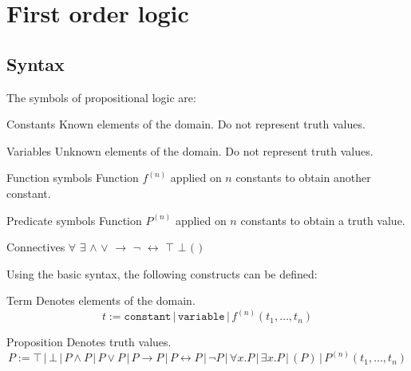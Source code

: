 \chapter{First order logic}


\section{Syntax}
The symbols of propositional logic are:
\begin{descriptionlist}
    \item[Constants]
        Known elements of the domain. Do not represent truth values.
        
    \item[Variables]
        Unknown elements of the domain. Do not represent truth values.
    
    \item[Function symbols] 
        Function $f^{(n)}$ applied on $n$ constants to obtain another constant.

    \item[Predicate symbols]
        Function $P^{(n)}$ applied on $n$ constants to obtain a truth value.

    \item[Connectives] $\forall$ $\exists$ $\land$ $\vee$ $\rightarrow$ $\lnot$ $\leftrightarrow$ $\top$ $\bot$ $($ $)$
\end{descriptionlist}

Using the basic syntax, the following constructs can be defined:
\begin{descriptionlist}
    \item[Term] Denotes elements of the domain.
        \[ t := \texttt{constant} \,|\, \texttt{variable} \,|\, f^{(n)}(t_1, \dots, t_n) \]

    \item[Proposition] Denotes truth values.
        \[
            P := \top \,|\, \bot \,|\, P \land P \,|\, P \vee P \,|\,  P \rightarrow P \,|\, P \leftrightarrow P \,|\, 
                \lnot P \,|\, \forall x. P \,|\, \exists x. P \,|\, (P) \,|\, P^{(n)}(t_1, \dots, t_n) 
        \]
\end{descriptionlist}


